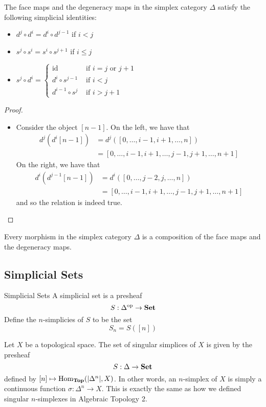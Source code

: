 \documentclass[a4paper]{article}
\begin{document}
\begin{prp}{}{} The face maps and the degeneracy maps in the simplex category $\Delta$ satisfy the following simplicial identities: 
\begin{itemize}
\item $d^j\circ d^i=d^i\circ d^{j-1}$ if $i<j$
\item $s^j\circ s^i=s^i\circ s^{j+1}$ if $i\leq j$
\item $s^j\circ d^i=\begin{cases}
\text{id} & \text{ if } i=j\text{ or }j+1\\
d^i\circ s^{j-1} & \text{ if } i<j\\
d^{i-1}\circ s^j & \text{ if }i>j+1
\end{cases}$
\end{itemize} \tcbline
\begin{proof}~\\
\begin{itemize}
\item Consider the object $[n-1]$. On the left, we have that 
\begin{align*}
d^j(d^i[n-1])&=d^j([0,\dots,i-1,i+1,\dots,n])\\
&=[0,\dots,i-1,i+1,\dots,j-1,j+1,\dots,n+1]
\end{align*}
On the right, we have that
\begin{align*}
d^i(d^{j-1}[n-1])&=d^i([0,\dots,j-2,j,\dots,n])\\
&=[0,\dots,i-1,i+1,\dots,j-1,j+1,\dots,n+1]
\end{align*} and so the relation is indeed true. 
\end{itemize}
\end{proof}
\end{prp}

\begin{prp}{}{} Every morphism in the simplex category $\Delta$ is a composition of the face maps and the degeneracy maps. 
\end{prp}

\subsection{Simplicial Sets}
\begin{defn}{Simplicial Sets}{} A simplicial set is a presheaf $$S:\Delta^\text{op}\to\bold{Set}$$ Define the $n$-simplicies of $S$ to be the set $$S_n=S([n])$$
\end{defn}

\begin{eg}{}{} Let $X$ be a topological space. The set of singular simplices of $X$ is given by the presheaf $$S:\Delta\to\bold{Set}$$ defined by $[n]\mapsto\operatorname{Hom}_\bold{Top}(\abs{\Delta^n},X)$. In other words, an $n$-simplex of $X$ is simply a continuous function $\sigma:\Delta^n\to X$. This is exactly the same as how we defined singular $n$-simplexes in Algebraic Topology 2. 
\end{eg}
\end{document}
